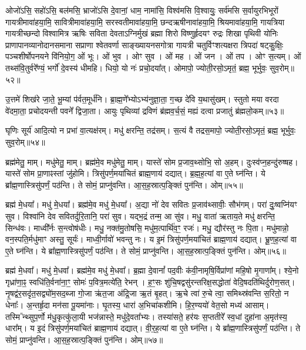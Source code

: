 ओजो॑ऽसि॒ सहो॑ऽसि॒ बल॑मसि॒ भ्राजो॑ऽसि दे॒वानां॒ धाम॒ नामा॑सि॒ विश्व॑मसि वि॒श्वायुः॒ सर्व॑मसि स॒र्वायुरभिभूरों गायत्रीमावा॑हया॒मि॒ सावित्रीमावा॑हया॒मि॒ सरस्वतीमावा॑ह\-या॒मि॒ छन्दऋषीनावा॑हया॒मि॒ श्रियमावा॑हया॒मि॒ गायत्रिया गायत्रीच्छन्दो विश्वामित्र ऋषिः सविता देवताऽग्निर्मुखं ब्रह्मा शिरो विष्णुर्\mbox{}हृदयꣳ रुद्रः शिखा पृथिवी योनिः प्राणापानव्यानोदानसमाना सप्राणा श्वेतवर्णा साङ्ख्यायनसगोत्रा गायत्री चतुर्विꣳशत्यक्षरा त्रिपदा॑ षट्कु॒क्षिः॒ पञ्चशीर्\mbox{}षोपनयने वि॑नियो॒ग॒ ओं भूः। 
ओं भुव। 
ओꣳ सुव। 
ओं मह। 
ओं जन। 
ओं तप। 
ओꣳ स॒त्यम्। 
ओं तथ्स॑वि॒तुर्वरे᳚ण्यं॒ भर्गो॑ दे॒वस्य॑ धीमहि। 
धियो॒ यो नः॑ प्रचो॒दया᳚त्। 
ओमापो॒ ज्योती॒रसो॒ऽमृतं॒ ब्रह्म॒ भूर्भुवः॒ सुव॒रोम्॥५२॥
\anuvakamend

उ॒त्तमे॑ शिख॑रे जा॒ते॒ भू॒म्यां प॑र्वत॒मूर्ध॑नि। 
ब्रा॒ह्म॒णे᳚भ्योऽभ्य॑नु\-ज्ञा॒ता॒ ग॒च्छ दे॑वि य॒थासु॑खम्। 
स्तुतो मया वरदा वे॑दमा॒ता॒ प्रचोदयन्ती पवने᳚ द्विजा॒ता। 
आयुः पृथिव्यां द्रविणं ब्र॑ह्मव॒र्च॒सं॒ मह्यं दत्वा प्रजातुं ब्र॑ह्मलो॒कम्॥५३॥
\anuvakamend

घृणिः सूर्य॑ आदि॒त्यो न प्रभा॑ वा॒त्यक्ष॑रम्। 
मधु॑ क्षरन्ति॒ तद्र॑सम्। 
स॒त्यं वै तद्रस॒मापो॒ ज्योती॒रसो॒ऽमृतं॒ ब्रह्म॒ भूर्भुवः॒ सुव॒रोम्॥५४॥\anuvakamend

ब्रह्म॑मेतु॒ माम्। 
मधु॑मेतु॒ माम्। 
ब्रह्म॑मे॒व मधु॑मेतु॒ माम्। 
यास्ते॑ सोम प्र॒जाव॒थ्सोभि॒ सो अ॒हम्। 
दुःस्व॑प्न॒हन्दु॑रुष्षह। 
यास्ते॑ सोम प्रा॒णाꣴस्तां जु॑होमि। 
त्रिसु॑पर्ण॒मया॑चितं ब्राह्म॒णाय॑ दद्यात्। 
ब्र॒ह्म॒ह॒त्यां वा ए॒ते घ्न॑न्ति। 
ये ब्रा᳚ह्म॒णास्त्रिसु॑पर्णं॒ पठ॑न्ति। 
ते सोमं॒ प्राप्नु॑वन्ति। 
आ॒स॒ह॒स्रात्प॒ङ्क्तिं पुन॑न्ति। 
ओम्॥५५॥
\anuvakamend

ब्रह्म॑ मे॒धया᳚। 
मधु॑ मे॒धया᳚। 
ब्रह्म॑मे॒व मधु॑ मे॒धया᳚। 
अ॒द्या नो॑ देव सवितः प्र॒जाव॑थ्सावीः॒ सौभ॑गम्। 
परा॑ दुः॒ष्वप्नि॑यꣳ सुव। 
विश्वा॑नि देव सवितर्दुरि॒तानि॒ परा॑ सुव। 
यद्भ॒द्रं तन्म॒ आ सु॑व। 
मधु॒ वाता॑ ऋताय॒ते मधु॑ क्षरन्ति॒ सिन्ध॑वः। 
माध्वी᳚र्नः स॒न्त्वोष॑धीः। 
मधु॒ नक्त॑मु॒तोषसि॒ मधु॑म॒त्पार्थि॑व॒ꣳ॒ रजः॑। 
मधु॒ द्यौर॑स्तु नः पि॒ता। 
मधु॑मान्नो॒ वन॒स्पति॒र्मधु॑माꣳ अस्तु॒ सूर्यः॑। 
माध्वी॒र्गावो॑ भवन्तु नः। 
य इ॒मं त्रिसु॑पर्ण॒मया॑चितं ब्राह्म॒णाय॑ दद्यात्। 
भ्रू॒ण॒ह॒त्यां वा ए॒ते घ्न॑न्ति। 
ये ब्रा᳚ह्म॒णास्त्रिसु॑पर्णं॒ पठ॑न्ति। 
ते सोमं॒ प्राप्नु॑वन्ति। 
आ॒स॒ह॒स्रात्प॒ङ्क्तिं पुन॑न्ति। 
ओम्॥५६॥
\anuvakamend


ब्रह्म॑ मे॒धवा᳚। 
मधु॑ मे॒धवा᳚। 
ब्रह्म॑मे॒व मधु॑ मे॒धवा᳚। 
ब्र॒ह्मा दे॒वानां᳚ पद॒वीः क॑वी॒नामृषि॒र्विप्रा॑णां महि॒षो मृ॒गाणा᳚म्। 
श्ये॒नो गृध्रा॑णा॒ꣴ॒ स्वधि॑ति॒र्वना॑ना॒ꣳ॒ सोमः॑ प॒वित्र॒मत्ये॑ति॒ रेभन्। 
ह॒ꣳ॒सः शु॑चि॒षद्वसु॑रन्तरिक्ष॒सद्धोता॑ वेदि॒षदति॑थिर्दुरोण॒सत्। 
नृ॒षद्व॑र॒सदृ॑त॒सद्व्यो॑म॒सद॒ब्जा गो॒जा ऋ॑त॒जा अ॑द्रि॒जा ऋ॒तं बृ॒हत्। 
ऋ॒चे त्वा॑ रु॒चे त्वा॒ समिथ्स्र॑वन्ति स॒रितो॒ न धेनाः᳚। 
अ॒न्तर्\mbox{}हृ॒दा मन॑सा पू॒यमा॑नाः। 
घृ॒तस्य॒ धारा॑ अ॒भिचा॑कशीमि। 
हि॒र॒ण्ययो॑ वेत॒सो मध्य॑ आसाम्। 
\mbox{तस्मि ᳚\hspace{-1.25ex}न्थ्सु}\-प॒र्णो म॑धु॒कृत्कु॑ला॒यी भज॑न्नास्ते॒ मधु॑\-दे॒वता᳚भ्यः। 
तस्या॑सते॒ हर॑यः स॒प्ततीरे᳚ स्व॒धां दुहा॑ना अ॒मृत॑स्य॒ धारा᳚म्। 
य इ॒दं त्रिसु॑पर्ण॒मया॑चितं ब्राह्म॒णाय॑ दद्यात्। 
वी॒र॒ह॒त्यां वा ए॒ते घ्न॑न्ति। 
ये ब्रा᳚ह्म॒णास्त्रिसु॑पर्णं॒ पठ॑न्ति। 
ते सोमं॒ प्राप्नु॑वन्ति। 
आ॒स॒ह॒स्रात्प॒ङ्क्तिं पुन॑न्ति। 
ओम्॥५७॥
\anuvakamend

